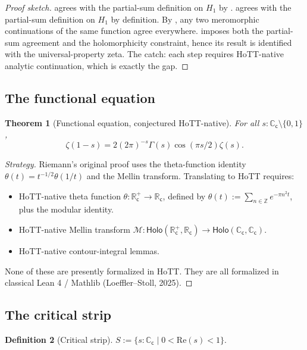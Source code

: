 \documentclass[12pt]{article}
\newtheorem{theorem}{Theorem}[section]
\theoremstyle{definition}
\newtheorem{definition}[theorem]{Definition}
\theoremstyle{remark}
\newcommand{\C}{\mathbb{C}}
\newcommand{\R}{\mathbb{R}}
\newcommand{\Z}{\mathbb{Z}}
\newcommand{\Cc}{\C_{\mathsf{c}}}
\newcommand{\Rc}{\R_{\mathsf{c}}}
\newcommand{\holo}{\mathsf{Holo}}
\begin{document}
\begin{proof}[Proof sketch]
 agrees with the partial-sum definition on $H_1$ by
.  agrees with the partial-sum definition
on $H_1$ by definition. By , any two meromorphic
continuations of the same function agree everywhere. 
imposes both the partial-sum agreement and the holomorphicity constraint,
hence its result is identified with the universal-property zeta. The
catch: each step requires HoTT-native analytic continuation, which is
exactly the gap.
\end{proof}

\subsection{The functional equation}

\begin{theorem}[Functional equation, conjectured HoTT-native]\label{thm:FE}
For all $s : \Cc \setminus \{0,1\}$,
\[
\zeta(1-s) = 2 (2\pi)^{-s} \Gamma(s) \cos(\pi s / 2) \zeta(s).
\]
\end{theorem}

\begin{proof}[Strategy]
Riemann's original proof uses the theta-function identity
$\theta(t) = t^{-1/2}\theta(1/t)$ and the Mellin transform. Translating to
HoTT requires:
\begin{itemize}
\item HoTT-native theta function $\theta:\Rc^+ \to \Rc$, defined by
$\theta(t) := \sum_{n \in \Z} e^{-\pi n^2 t}$, plus the modular identity.
\item HoTT-native Mellin transform $\mathcal{M}:\holo(\Rc^+,\Rc) \to \holo(\Cc,\Cc)$.
\item HoTT-native contour-integral lemmas.
\end{itemize}
None of these are presently formalized in HoTT. They are all formalized in
classical Lean 4 / Mathlib (Loeffler--Stoll, 2025).
\end{proof}

\subsection{The critical strip}

\begin{definition}[Critical strip]
$S := \{s : \Cc \mid 0 < \mathrm{Re}(s) < 1\}$.
\end{definition}
\end{document}
